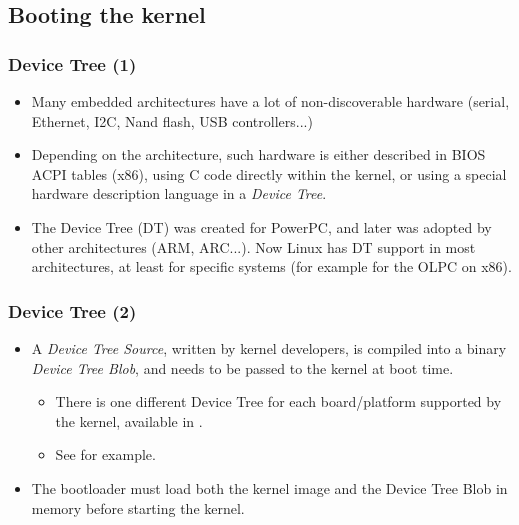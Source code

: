 \subsection{Booting the kernel}

\begin{frame}
  \frametitle{Device Tree (1)}
  \begin{itemize}
  \item Many embedded architectures have a lot of non-discoverable
    hardware (serial, Ethernet, I2C, Nand flash, USB  controllers...)
  \item Depending on the architecture, such hardware is either
    described in BIOS ACPI tables (x86), using C code directly within the kernel,
    or using a special hardware description language in a {\em Device Tree}.
  \item The Device Tree (DT) was created for PowerPC, and later was
    adopted by other architectures (ARM, ARC...). Now Linux
    has DT support in most architectures, at least for specific
    systems (for example for the OLPC on x86).
  \end{itemize}
\end{frame}

\begin{frame}
  \frametitle{Device Tree (2)}
  \begin{itemize}
  \item A {\em Device Tree Source}, written by kernel developers,
    is compiled into a binary {\em Device Tree Blob}, and needs to
    be passed to the kernel at boot time.
    \begin{itemize}
    \item There is one different Device Tree for each board/platform
      supported by the kernel, available in
      .
     \item See  for
      example.
    \end{itemize}
  \item The bootloader must load both the kernel image and the Device
    Tree Blob in memory before starting the kernel.
  \end{itemize}
\end{frame}

